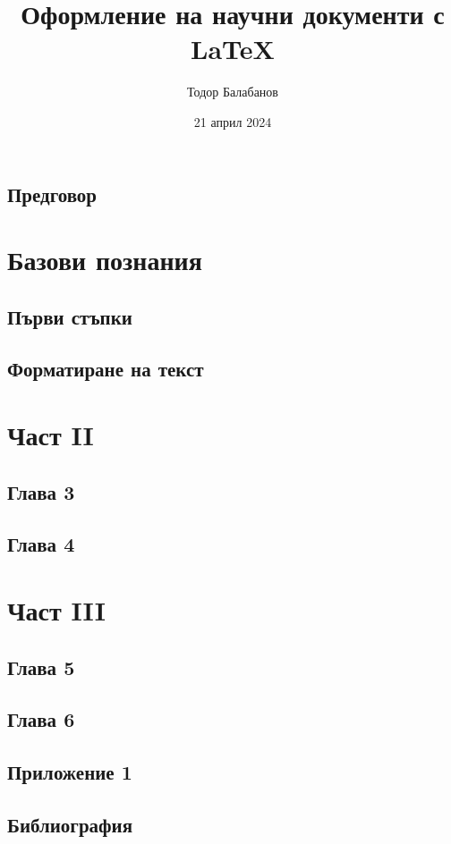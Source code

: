 \documentclass{book}
\title{Оформление на научни документи с LaTeX}
\author{Тодор Балабанов}
\date{21 април 2024}
\begin{document}
\maketitle

\frontmatter

\tableofcontents
\listoffigures
\lstlistoflistings

\mainmatter

\chapter*{Предговор}


\part{Базови познания}

\chapter{Първи стъпки}


\chapter{Форматиране на текст}


\part{Част II}

\chapter{Глава 3}

\chapter{Глава 4}

\part{Част III}

\chapter{Глава 5}

\chapter{Глава 6}

\appendix

\chapter{Приложение 1}

\backmatter

\chapter{Библиография}

\end{document}
